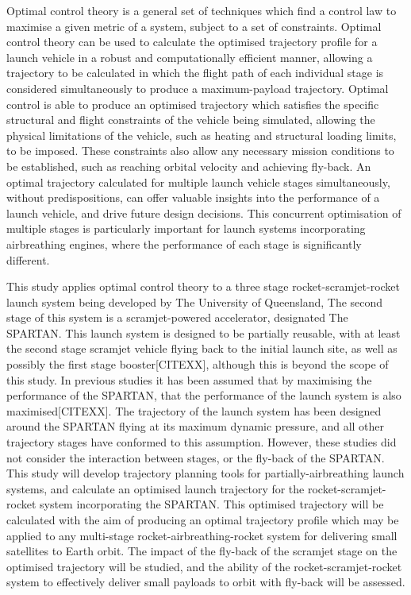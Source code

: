     Optimal control theory is a general set of techniques which find a control law to maximise a given metric of a system, subject to a set of constraints\cite{Rao2009,Betts1998}. 
    Optimal control theory can be used to calculate the optimised trajectory profile for a launch vehicle in a robust and computationally efficient manner, allowing a trajectory to be calculated in which the flight path of each individual stage is considered simultaneously to produce a maximum-payload trajectory\cite{Betts1998}. 
  Optimal control is able to produce an optimised trajectory which satisfies the specific structural and flight constraints of the vehicle being simulated, allowing the physical limitations of the vehicle, such as heating and structural loading limits, to be imposed\cite{Betts1998}. These constraints also allow any necessary mission conditions to be established, such as reaching orbital velocity and achieving fly-back. 
  An optimal trajectory calculated for multiple launch vehicle stages simultaneously, without predispositions, can offer valuable insights into the performance of a launch vehicle, and drive future design decisions. 
  This concurrent optimisation of multiple stages is particularly important for launch systems incorporating airbreathing engines, where the performance of each stage is significantly different.  
  



  
  
  	   This study applies optimal control theory to a three stage rocket-scramjet-rocket launch system being developed by The University of Queensland, The second stage of this system is a scramjet-powered accelerator, designated The SPARTAN\cite{Preller2017b}. This launch system is designed to be partially reusable, with at least the second stage scramjet vehicle flying back to the initial launch site, as well as possibly the first stage booster[CITEXX], although this is beyond the scope of this study. 
  	   In previous studies it has been assumed that by maximising the performance of the SPARTAN, that the performance of the launch system is also maximised[CITEXX]. 
  	   The trajectory of the launch system has been designed around the SPARTAN flying at its
  	   maximum dynamic pressure, and all other trajectory stages have conformed to this assumption. However, these studies did not consider the interaction between stages, or the fly-back of the SPARTAN.
  	   This study will develop trajectory planning tools for partially-airbreathing launch systems, and calculate an optimised launch trajectory for the rocket-scramjet-rocket system incorporating the SPARTAN. This optimised trajectory will be calculated with the aim of producing an optimal
  	   trajectory profile which may be applied to any multi-stage rocket-airbreathing-rocket system for delivering small
  	   satellites to Earth orbit. The impact of the fly-back of the scramjet stage on the optimised trajectory will be studied, and the ability of the rocket-scramjet-rocket system to effectively deliver small payloads to orbit with fly-back will be assessed. 
  	   
